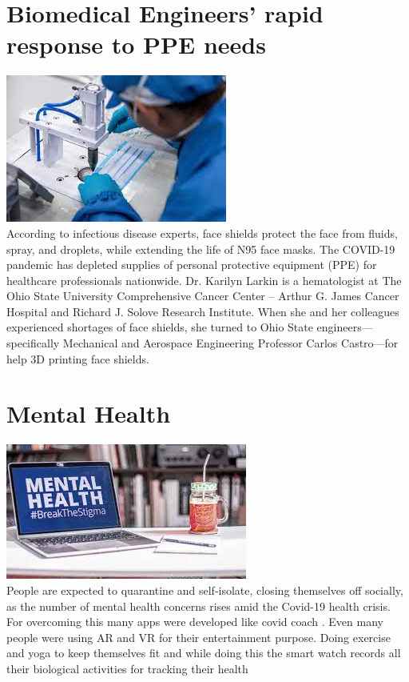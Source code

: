 \documentclass[12pt]{article}
\begin{document}
\section{Biomedical Engineers’ rapid response to PPE needs}
\includegraphics[scale=0.65]{ppe.jpeg} 
\\
According to infectious disease experts, face shields protect the face from
fluids, spray, and droplets, while extending the life of N95 face masks.
The COVID-19 pandemic has depleted supplies of personal protective equipment (PPE) for healthcare professionals nationwide. Dr. Karilyn Larkin is a
hematologist at The Ohio State University Comprehensive Cancer Center –
Arthur G. James Cancer Hospital and Richard J. Solove Research Institute.
When she and her colleagues experienced shortages of face shields, she turned
to Ohio State engineers—specifically Mechanical and Aerospace Engineering
Professor Carlos Castro—for help 3D printing face shields.
\section{Mental Health}
\includegraphics[scale=0.65]{mh.jpeg}
\\
People are expected to quarantine and self-isolate, closing themselves off
socially, as the number of mental health concerns rises amid the Covid-19
health crisis.
For overcoming this many apps were developed like covid coach .
Even many people were using AR and VR for their entertainment
purpose. Doing exercise and yoga to keep themselves fit and while doing
this the smart watch records all their biological activities for tracking
their health
\end{document}
